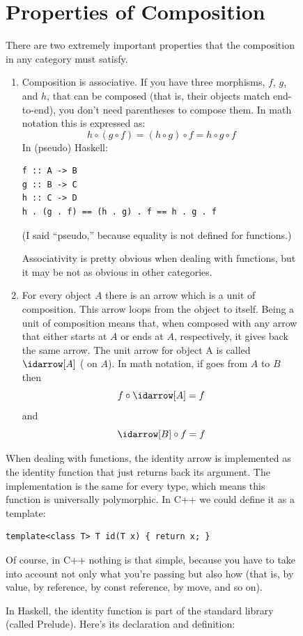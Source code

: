 \begin{figure}
\section{Properties of Composition}\label{properties-of-composition}

There are two extremely important properties that the composition in any
category must satisfy.

\begin{enumerate}
\item
Composition is associative. If you have three morphisms, $f$, $g$, and $h$,
that can be composed (that is, their objects match end-to-end), you
don't need parentheses to compose them. In math notation this is
expressed as:
\[h\circ{}(g\circ{}f) = (h\circ{}g)\circ{}f = h\circ{}g\circ{}f\]
In (pseudo) Haskell:

\begin{Verbatim}
f :: A -> B
g :: B -> C
h :: C -> D
h . (g . f) == (h . g) . f == h . g . f
\end{Verbatim}
(I said ``pseudo,'' because equality is not defined for functions.)

Associativity is pretty obvious when dealing with functions, but it may
be not as obvious in other categories.

\item
For every object $A$ there is an arrow which is a unit of composition.
This arrow loops from the object to itself. Being a unit of composition
means that, when composed with any arrow that either starts at $A$ or ends
at $A$, respectively, it gives back the same arrow. The unit arrow for
object A is called $\idarrow[A]$ ( on $A$). In math
notation, if  goes from $A$ to $B$ then
\[f \circ \idarrow[A] = f\]
and
\[\idarrow[B] \circ f = f\]
\end{enumerate}
When dealing with functions, the identity arrow is implemented as the
identity function that just returns back its argument. The
implementation is the same for every type, which means this function is
universally polymorphic. In C++ we could define it as a template:

\begin{Verbatim}
template<class T> T id(T x) { return x; }
\end{Verbatim}
Of course, in C++ nothing is that simple, because you have to take into
account not only what you're passing but also how (that is, by value, by
reference, by const reference, by move, and so on).

In Haskell, the identity function is part of the standard library
(called Prelude). Here's its declaration and definition:


\end{figure}
